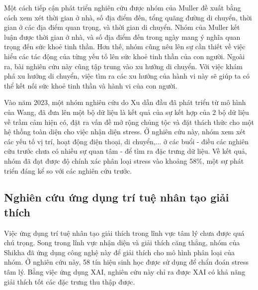Một cách tiếp cận phát triển nghiên cứu \cite{student_life4} được nhóm của Muller đề xuất \cite{Muller} bằng cách xem xét thời gian ở nhà, số địa điểm đến, tổng quãng đường di chuyển, thời gian ở các địa điểm quan trọng, và thời gian di chuyển. Nhóm của Muller kết luận được thời gian ở nhà, và số địa điểm đến trong ngày mang ý nghĩa quan trọng đến sức khoẻ tinh thần. Hơn thế, nhóm cũng nêu lên sự cần thiết về việc hiểu các tác động của từng yếu tố lên sức khoẻ tinh thần của con người. Ngoài ra, bài nghiên cứu này cũng tập trung vào xu hướng di chuyển. Với việc khám phá xu hướng di chuyển, việc tìm ra các xu hướng của hành vi này sẽ giúp ta có thể kết nối sức khoẻ tinh thần và hành vi của con người.

Vào năm 2023, một nhóm nghiên cứu do Xu dẫn đầu đã phát triển từ mô hình của Wang, đã đưa lên một bộ dữ liệu là kết quả của sự kết hợp của 2 bộ dữ liệu về trầm cảm hiện có, đặt ra vấn đề mở rộng chủng tộc và đặt thách thức cho một hệ thồng toàn diện cho việc nhận diện stress\cite{student_life2}. Ở nghiên cứu này, nhóm xem xét các yếu tố vị trí, hoạt động điện thoại, di chuyển,... ở các buổi - điều các nghiên cứu trước chưa có nhiều sự quan tâm - để tìm ra đặc trưng dữ liệu. Về kết quả, nhóm đã đạt được độ chính xác phân loại stress vào khoảng 58\%, một sự phát triển đáng kể so với các nghiên cứu trước.



\subsection{Nghiên cứu ứng dụng trí tuệ nhân tạo giải thích}
Việc ứng dụng trí tuệ nhân tạo giải thích trong lĩnh vực tâm lý chưa được quá chú trọng. Song trong lĩnh vực nhận diện và giải thích căng thẳng, nhóm của Shikha \cite{Shikha} đã ứng dụng công nghệ này để giải thích cho mô hình phân loại của nhóm. Ở nghiên cứu này, 58 tín hiệu sinh học được sử dụng để chẩn đoán stress tâm lý. Bằng việc ứng dụng XAI, nghiên cứu này chỉ ra được XAI có khả năng giải thích tốt các đặc trưng thu thập được. 

